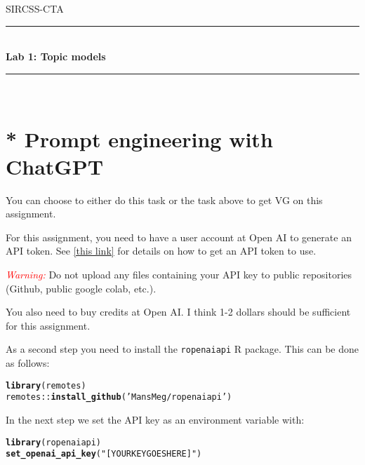 \documentclass[11pt,a4paper,english]{article}\usepackage[]{graphicx}\usepackage[]{xcolor}
\makeatletter
\newcommand{\hlstr}[1]{\textcolor[rgb]{0.192,0.494,0.8}{#1}}%
\newcommand{\hlopt}[1]{\textcolor[rgb]{0,0,0}{#1}}%
\newcommand{\hlstd}[1]{\textcolor[rgb]{0.345,0.345,0.345}{#1}}%
\newcommand{\hlkwd}[1]{\textcolor[rgb]{0.737,0.353,0.396}{\textbf{#1}}}%
\newenvironment{kframe}{%
 \def\at@end@of@kframe{}%
 \ifinner\ifhmode%
  \def\at@end@of@kframe{\end{minipage}}%
  \begin{minipage}{\columnwidth}%
 \fi\fi%
 \def\FrameCommand##1{\hskip\@totalleftmargin \hskip-\fboxsep
 \colorbox{shadecolor}{##1}\hskip-\fboxsep
     \hskip-\linewidth \hskip-\@totalleftmargin \hskip\columnwidth}%
 \MakeFramed {\advance\hsize-\width
   \@totalleftmargin\z@ \linewidth\hsize
   \@setminipage}}%
 {\par\unskip\endMakeFramed%
 \at@end@of@kframe}
\newenvironment{knitrout}{}{} %
\newcommand{\HRule}{\rule{\linewidth}{0.5mm}}
\makeatother
\begin{document}

\begin{titlepage}

\center
\textsc{\LARGE SIRCSS-CTA}\\[1.5cm] %

\HRule \\[0.4cm]
{ \huge \bfseries Lab 1: Topic models}\\[0.4cm] %
\HRule \\[1.5cm]

\vfill

\end{titlepage}





\section{* Prompt engineering with ChatGPT}

You can choose to either do this task or the task above to get VG on this assignment.



For this assignment, you need to have a user account at Open AI to generate an API token. See \href{https://help.openai.com/en/articles/4936850-where-do-i-find-my-api-key}{[this link]} for details on how to get an API token to use.

\textcolor{red}{\emph{Warning:}} Do not upload any files containing your API key to public repositories (Github, public google colab, etc.).

You also need to buy credits at Open AI. I think 1-2 dollars should be sufficient for this assignment.

As a second step you need to install the \texttt{ropenaiapi} R package. This can be done as follows:
\begin{knitrout}\small
{}\color{fgcolor}\begin{kframe}
\begin{alltt}
\hlkwd{library}\hlstd{(remotes)}
\hlstd{remotes}\hlopt{::}\hlkwd{install_github}\hlstd{(}\hlstr{'MansMeg/ropenaiapi'}\hlstd{)}
\end{alltt}
\end{kframe}
\end{knitrout}
In the next step we set the API key as an environment variable with:
\begin{knitrout}\small
{}\color{fgcolor}\begin{kframe}
\begin{alltt}
\hlkwd{library}\hlstd{(ropenaiapi)}
\hlkwd{set_openai_api_key}\hlstd{(}\hlstr{"[YOUR KEY GOES HERE]"}\hlstd{)}
\end{alltt}
\end{kframe}
\end{knitrout}
\end{document}
